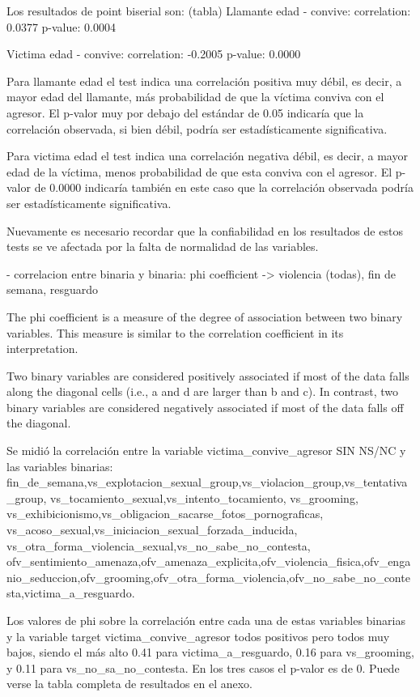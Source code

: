 \documentclass[10pt, spanish]{article}
\begin{document}
Los resultados de point biserial son: (tabla)
Llamante edad - convive:
correlation: 0.0377
p-value: 0.0004


Victima edad - convive:
correlation: -0.2005
p-value:  0.0000

Para llamante edad el test indica una correlación positiva muy débil, es decir, a mayor edad del llamante, más probabilidad de que la víctima conviva con el agresor. El p-valor muy por debajo del estándar de 0.05 indicaría que la correlación observada, si bien débil, podría ser estadísticamente significativa. 

Para victima edad el test indica una correlación negativa débil, es decir, a mayor edad de la víctima, menos probabilidad de que esta conviva con el agresor. El p-valor de 0.0000 indicaría también en este caso que la correlación observada podría ser estadísticamente significativa. 

Nuevamente es necesario recordar que la confiabilidad en los resultados de estos tests se ve afectada por la falta de normalidad de las variables.


- correlacion entre binaria y binaria: phi coefficient -> violencia (todas), fin de semana,  resguardo

The phi coefficient is a measure of the degree of association between two binary variables. This measure is similar to the correlation coefficient in its interpretation.

Two binary variables are considered positively associated if most of the data falls along the diagonal cells (i.e., a and d are larger than b and c). In contrast, two binary variables are considered negatively associated if most of the data falls off the diagonal.

Se midió la correlación entre la variable victima_convive_agresor SIN NS/NC y las variables binarias: fin_de_semana,vs_explotacion_sexual_group,vs_violacion_group,vs_tentativa_group, vs_tocamiento_sexual,vs_intento_tocamiento, vs_grooming, vs_exhibicionismo,vs_obligacion_sacarse_fotos_pornograficas, vs_acoso_sexual,vs_iniciacion_sexual_forzada_inducida, vs_otra_forma_violencia_sexual,vs_no_sabe_no_contesta, ofv_sentimiento_amenaza,ofv_amenaza_explicita,ofv_violencia_fisica,ofv_enganio_seduccion,ofv_grooming,ofv_otra_forma_violencia,ofv_no_sabe_no_contesta,victima_a_resguardo. 

Los valores de phi sobre la correlación entre cada una de estas variables binarias y la variable target victima_convive_agresor todos positivos pero todos muy bajos, siendo el más alto 0.41 para victima_a_resguardo, 0.16 para vs_grooming, y 0.11 para vs_no_sa_no_contesta. En los tres casos el p-valor es de 0. Puede verse la tabla completa de resultados en el anexo.
\end{document}
